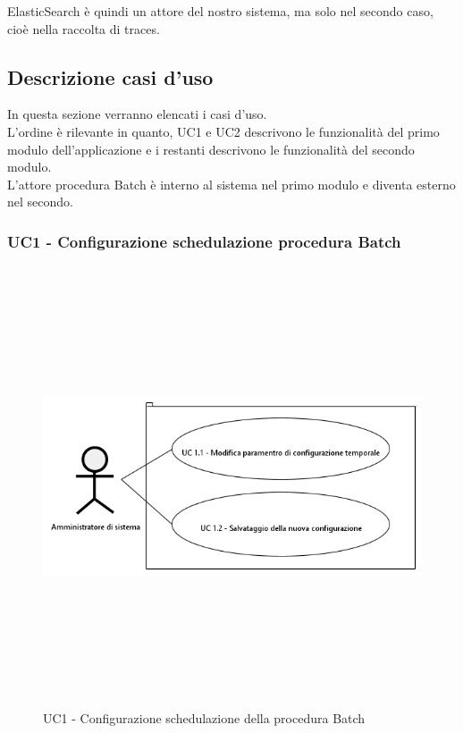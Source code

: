         ElasticSearch è quindi un attore del nostro sistema, ma solo nel secondo caso, cioè nella raccolta di traces.

\newpage

    \subsection{Descrizione casi d'uso} \label{descr casi uso}

        In questa sezione verranno elencati i casi d'uso. \\
        L'ordine è rilevante in quanto, UC1 e UC2 descrivono le funzionalità del primo modulo dell'applicazione e
        i restanti descrivono le funzionalità del secondo modulo. \\
        L'attore procedura Batch è interno al sistema nel primo modulo e diventa esterno nel secondo.

        \subsubsection{UC1 - Configurazione schedulazione procedura Batch}

            \begin{figure}[H]
                \centering
                \includegraphics[width=13cm,height=13cm,keepaspectratio]{./images/UC1.png}
                \caption{UC1 - Configurazione schedulazione della procedura Batch}
            \end{figure}

